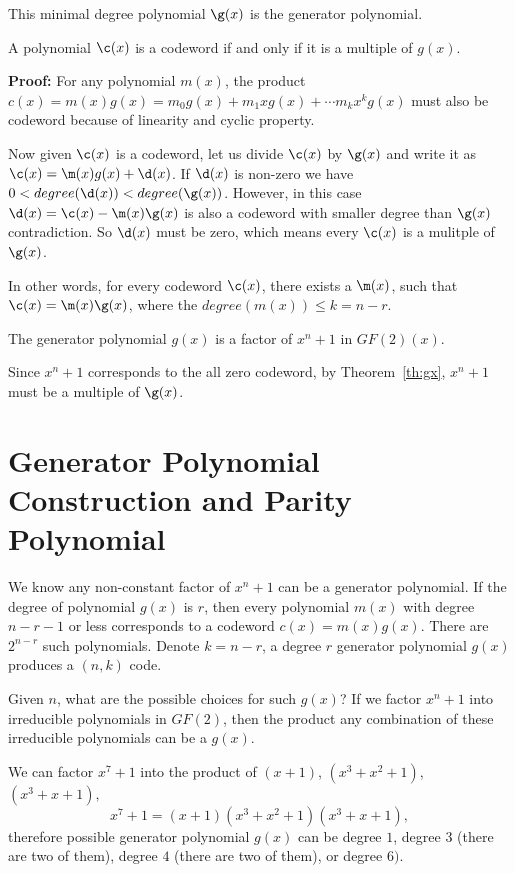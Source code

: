 This minimal degree polynomial \(\g(x)\) is the generator polynomial. 

\begin{theorem}
A polynomial \(\c(x)\) is a codeword if and only if it is a multiple of \(g(x)\).
\label{th:gx}
\end{theorem}


\textbf{Proof:} For any polynomial \(m(x)\), the product \(c(x) = m(x) g(x) = m_0 g(x) + m_1 xg(x) + \cdots m_k x^k g(x)\) must also be codeword because of linearity and cyclic property. 

Now given \(\c(x)\) is a codeword, let us divide \(\c(x)\) by \(\g(x)\) and write it as \(\c(x) = \m(x) g(x) + \d(x)\). If \(\d(x)\) is non-zero we have \(0 < degree(\d(x)) < degree(\g(x))\). However, in this case \(\d(x) = \c(x) - \m(x)\g(x) \) is also a codeword with smaller degree than \(\g(x)\) contradiction. So \(\d(x)\) must be zero, which means every \(\c(x)\) is a mulitple of \(\g(x)\). 

 In other words, for every codeword \(\c(x)\), there exists a \(\m(x)\), such that \(\c(x) = \m(x) \g(x)\), where the \(degree(m(x)) \leq k = n - r\).
 
\begin{theorem}
The generator polynomial \(g(x)\) is a factor of \(x^n +1\) in \(GF(2)(x)\).
\end{theorem}

 Since \(x^n+1\) corresponds to the all zero codeword, by Theorem~\ref{th:gx}, \(x^n+1\) must be a multiple of \(\g(x)\). 

\section{Generator Polynomial Construction and Parity Polynomial}
We know any non-constant factor of \(x^{n} + 1\) can be a generator polynomial. If the degree of polynomial \(g(x)\) is \(r\), then every polynomial \(m(x)\) with degree \(n-r-1\) or less corresponds to a codeword \(c(x) = m(x) g(x)\). There are \(2^{n-r}\) such polynomials. Denote \(k=n-r\), a degree \(r\) generator polynomial \(g(x)\) produces a \((n,k)\) code. 

Given \(n\), what are the possible choices for such \(g(x)\)? If we factor \(x^n + 1\) into irreducible polynomials in \(GF(2)\), then the product any combination of these irreducible polynomials can be a \(g(x)\).

\begin{example}
We can factor \(x^7 + 1\) into the product of \((x+1)\), \((x^3+x^2+ 1)\), \((x^3 + x + 1),\) 
\[x^7 + 1 =(x+1)(x^3+x^2+ 1)(x^3 + x + 1), \]
therefore possible generator polynomial \(g(x)\) can be degree \(1\), degree \(3\) (there are two of them), degree \(4\) (there are two of them), or degree \(6)\). 
\end{example}

